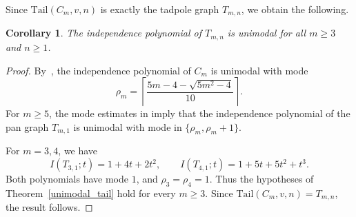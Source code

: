 \documentclass[12pt,twoside]{amsart}
\newtheorem{corollary}[thm]{Corollary}
\theoremstyle{definition}
\theoremstyle{mystyle}
\newcommand{\tail}[1]{\mathrm{Tail}(#1)}
\begin{document}
Since $\tail{C_m,v,n}$ is exactly the tadpole graph $T_{m,n}$, we obtain the following.

\begin{corollary}\label{cor:unimodality_Tadpoles}
 The independence polynomial of $T_{m,n}$ is unimodal for all $m\geq 3$ and $n\geq 1$. 
\end{corollary}
\begin{proof}
	By~\cite[Proposition~3.3]{NT24b}, the independence
	polynomial of $C_m$ is unimodal with mode
	\[
	\rho_m=
	\left\lceil
	\frac{5m-4-\sqrt{5m^2-4}}{10}
	\right\rceil.
	\]
	For $m\geq5$, the mode estimates in
	\cite[Lemmas~3.4--3.6]{NT24b} imply that the
	independence polynomial of the pan graph $T_{m,1}$
	is unimodal with mode in $\{\rho_m,\rho_m+1\}$.
	
	For $m=3,4$, we have
	\[
	I(T_{3,1};t)=1+4t+2t^2,
	\qquad
	I(T_{4,1};t)=1+5t+5t^2+t^3.
	\]
	Both polynomials have mode $1$, and
	$\rho_3=\rho_4=1$. Thus the hypotheses of
	Theorem~\ref{unimodal_tail} hold for every $m\geq3$.
	Since $\tail{C_m,v,n}=T_{m,n}$, the result follows.
\end{proof}
\end{document}

